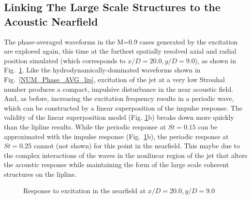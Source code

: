 \documentclass[english]{aiaa-tc}
\begin{document}
\subsection{Linking The Large Scale Structures to the Acoustic Nearfield}
The phase-averaged waveforms in the M=0.9 cases generated by the excitation are explored again, this time at the furthest spatially resolved axial and radial position simulated (which corresponds to $x/D = 20.0, y/D = 9.0$), as shown in Fig.~\ref{NUM_FF}.
Like the hydrodynamically-dominated waveforms shown in Fig.~\ref{NUM_Phase_AVG_lip}, excitation of the jet at a very low Strouhal number produces a compact, impulsive disturbance in the near acoustic field.
And, as before, increasing the excitation frequency results in a periodic wave, which can be constructed by a linear superposition of the impulse response.
The validity of the linear superposition model (Fig. \ref{NUM_FF}b) breaks down more quickly than the lipline results.
While the periodic response at $St = 0.15$ can be approximated with the impulse response (Fig.~\ref{NUM_FF}b), the periodic response at $St = 0.25$ cannot (not shown) for this point in the nearfield. This maybe due to the complex interactions of the waves in the nonlinear region of the jet that alters the acoustic response while maintaining the form of the large scale coherent structures on the lipline.
\begin{figure}
	\centering{}
	\caption{Response to excitation in the nearfield at $x/D = 20.0, y/D = 9.0$}\label{NUM_FF}
\end{figure}
\end{document}
